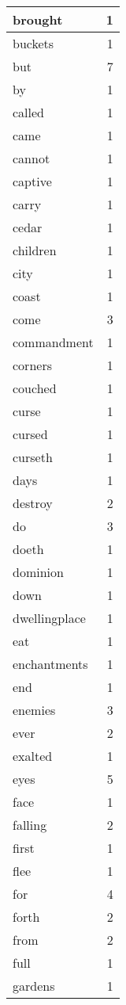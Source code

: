 \begin{center}
\begin{longtable}{l|r}
brought & 1\\ \hline 
buckets & 1\\ \hline 
but & 7\\ \hline 
by & 1\\ \hline 
called & 1\\ \hline 
came & 1\\ \hline 
cannot & 1\\ \hline 
captive & 1\\ \hline 
carry & 1\\ \hline 
cedar & 1\\ \hline 
children & 1\\ \hline 
city & 1\\ \hline 
coast & 1\\ \hline 
come & 3\\ \hline 
commandment & 1\\ \hline 
corners & 1\\ \hline 
couched & 1\\ \hline 
curse & 1\\ \hline 
cursed & 1\\ \hline 
curseth & 1\\ \hline 
days & 1\\ \hline 
destroy & 2\\ \hline 
do & 3\\ \hline 
doeth & 1\\ \hline 
dominion & 1\\ \hline 
down & 1\\ \hline 
dwellingplace & 1\\ \hline 
eat & 1\\ \hline 
enchantments & 1\\ \hline 
end & 1\\ \hline 
enemies & 3\\ \hline 
ever & 2\\ \hline 
exalted & 1\\ \hline 
eyes & 5\\ \hline 
face & 1\\ \hline 
falling & 2\\ \hline 
first & 1\\ \hline 
flee & 1\\ \hline 
for & 4\\ \hline 
forth & 2\\ \hline 
from & 2\\ \hline 
full & 1\\ \hline 
gardens & 1\\ \hline 

\end{longtable}
\end{center}

